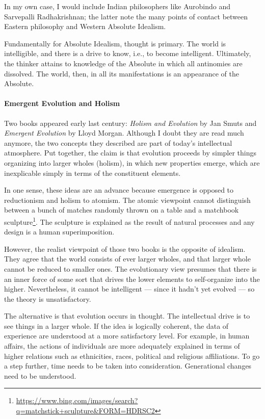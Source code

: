 In my own case, I would include Indian philosophers like Aurobindo and Sarvepalli Radhakrishnan; the latter note the many points of contact between Eastern philosophy and Western Absolute Idealism.

Fundamentally for Absolute Idealism, thought is primary. The world is intelligible, and there is a drive to know, i.e., to become intelligent. Ultimately, the thinker attains to knowledge of the Absolute in which all antinomies are dissolved. The world, then, in all its manifestations is an appearance of the Absolute.

\paragraph{Emergent Evolution and Holism}


Two books appeared early last century: \emph{Holism and Evolution} by Jan Smuts and \emph{Emergent Evolution} by Lloyd Morgan. Although I doubt they are read much anymore, the two concepts they described are part of today's intellectual atmosphere. Put together, the claim is that evolution proceeds by simpler things organizing into larger wholes (holism), in which new properties emerge, which are inexplicable simply in terms of the constituent elements.

In one sense, these ideas are an advance because emergence is opposed to reductionism and holism to atomism. The atomic viewpoint cannot distinguish between a bunch of matches randomly thrown on a table and a matchbook sculpture\footnote{\url{https://www.bing.com/images/search?q=matchstick+sculpture\&FORM=HDRSC2}}. The sculpture is explained as the result of natural processes and any design is a human superimposition.

However, the realist viewpoint of those two books is the opposite of idealism. They agree that the world consists of ever larger wholes, and that larger whole cannot be reduced to smaller ones. The evolutionary view presumes that there is an inner force of some sort that drives the lower elements to self-organize into the higher. Nevertheless, it cannot be intelligent --- since it hadn't yet evolved --- so the theory is unsatisfactory.

The alternative is that evolution occurs in thought. The intellectual drive is to see things in a larger whole. If the idea is logically coherent, the data of experience are understood at a more satisfactory level. For example, in human affairs, the actions of individuals are more adequately explained in terms of higher relations such as ethnicities, races, political and religious affiliations. To go a step further, time needs to be taken into consideration. Generational changes need to be understood.

